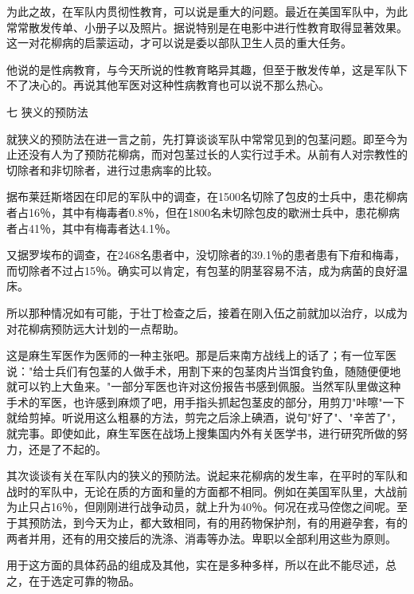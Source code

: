 \documentclass[12pt,UTF8]{ctexbook}
\begin{document}
为此之故，在军队内贯彻性教育，可以说是重大的问题。最近在美国军队中，为此常常散发传单、小册子以及照片。据说特别是在电影中进行性教育取得显著效果。这一对花柳病的启蒙运动，才可以说是委以部队卫生人员的重大任务。

他说的是性病教育，与今天所说的性教育略异其趣，但至于散发传单，这是军队下不了决心的。再说其他军医对这种性病教育也可以说不那么热心。



七 狭义的预防法



就狭义的预防法在进一言之前，先打算谈谈军队中常常见到的包茎问题。即至今为止还没有人为了预防花柳病，而对包茎过长的人实行过手术。从前有人对宗教性的切除者和非切除者，进行过患病率的比较。



据布莱廷斯塔因在印尼的军队中的调查，在1500名切除了包皮的士兵中，患花柳病者占16％，其中有梅毒者0.8％，但在1800名未切除包皮的歇洲士兵中，患花柳病者占41％，其中有梅毒者达4.1％。



又据罗埃布的调查，在2468名患者中，没切除者的39.1％的患者患有下疳和梅毒，而切除者不过占15％。确实可以肯定，有包茎的阴茎容易不洁，成为病菌的良好温床。



所以那种情况如有可能，于壮丁检查之后，接着在刚入伍之前就加以治疗，以成为对花柳病预防远大计划的一点帮助。



这是麻生军医作为医师的一种主张吧。那是后来南方战线上的话了；有一位军医说："给士兵们有包茎的人做手术，用割下来的包茎肉片当饵食钓鱼，随随便便地就可以钓上大鱼来。"一部分军医也许对这份报告书感到佩服。当然军队里做这种手术的军医，也许感到麻烦了吧，用手指头抓起包茎皮的部分，用剪刀"咔嚓"一下就给剪掉。听说用这么粗暴的方法，剪完之后涂上碘酒，说句"好了"、"辛苦了"，就完事。即使如此，麻生军医在战场上搜集国内外有关医学书，进行研究所做的努力，还是了不起的。



其次谈谈有关在军队内的狭义的预防法。说起来花柳病的发生率，在平时的军队和战时的军队中，无论在质的方面和量的方面都不相同。例如在美国军队里，大战前为止只占16％，但刚刚进行战争动员，就上升为40％。何况在戎马倥偬之间呢。至于其预防法，到今天为止，都大致相同，有的用药物保护剂，有的用避孕套，有的两者并用，还有的用交接后的洗涤、消毒等办法。卑职以全部利用这些为原则。



用于这方面的具体药品的组成及其他，实在是多种多样，所以在此不能尽述，总之，在于选定可靠的物品。
\end{document}
